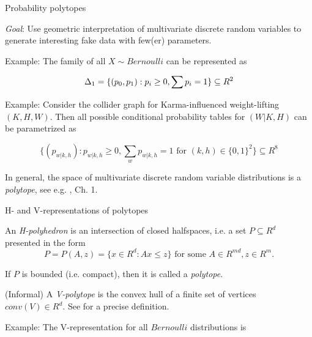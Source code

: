 \begin{frame}{Probability polytopes}

  \emph{Goal}: Use geometric interpretation of multivariate discrete random variables to generate interesting fake data with few(er) parameters.\newline

  Example: The family of all $X \sim Bernoulli$ can be represented as

  \begin{equation*}
    \Delta_1 = \{(p_0, p_1): p_i \geq 0, \sum p_i = 1\} \subseteq R^2\newline
  \end{equation*}

  Example: Consider the collider graph for Karma-influenced weight-lifting $(K, H, W)$. Then all possible conditional probability tables for $(W | K, H)$ can be parametrized as

  \begin{equation*}
    \{(p_{w | k, h}): p_{w | k, h} \geq 0, \sum_w p_{w  | k,h} = 1 \textrm{ for } (k, h) \in \{0, 1\}^2\} \subseteq R^8
  \end{equation*}

  In general, the space of multivariate discrete random variable distributions is a \emph{polytope}, see e.g. \cite{drton2008lectures}, Ch. 1.
\end{frame}


\begin{frame}{H- and V-representations of polytopes}

  \begin{definition}
    An \emph{H-polyhedron} is an intersection of closed halfspaces, i.e. a set $P \subseteq R^d$ presented in the form
    \begin{equation*}
      P = P(A,z)=\{ x \in R^d: Ax \leq z\} \textrm{ for some } A \in R^{m d}, z \in R^m.
    \end{equation*}
  \end{definition}

  If $P$ is bounded (i.e. compact), then it is called a \emph{polytope}.

  \begin{definition}
    (Informal) A \emph{V-polytope} is the convex hull of a finite set of vertices $conv(V) \in R^d$. See \cite{ziegler2012lectures} for a precise definition.
  \end{definition}

  Example: The V-representation for all $Bernoulli$ distributions is
\end{frame}


